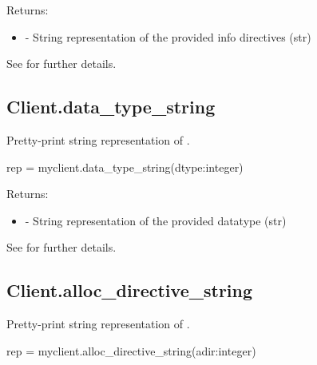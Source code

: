 Returns:
\begin{itemize}
    \item {} - String representation of the provided info directives (str)
\end{itemize}

See  for further details.


\subsection{Client.data_type_string}

\summary

Pretty-print string representation of .

\format

\pyspecificstart
\begin{codepar}
rep = myclient.data_type_string(dtype:integer)
\end{codepar}
\pyspecificend

\begin{arglist}
\end{arglist}

Returns:
\begin{itemize}
    \item {} - String representation of the provided datatype (str)
\end{itemize}

See  for further details.


\subsection{Client.alloc_directive_string}

\summary

Pretty-print string representation of .

\format

\pyspecificstart
\begin{codepar}
rep = myclient.alloc_directive_string(adir:integer)
\end{codepar}
\pyspecificend

